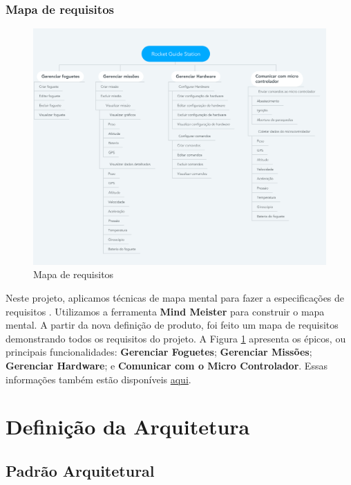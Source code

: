 \subsubsection{Mapa de requisitos}

\begin{figure}[h!]
\centering
\includegraphics[scale=0.18]{figuras/Rocket_Guide_Station.png}  
\caption{Mapa de requisitos}
\label{fig:Mindmeister}
\end{figure}

\par Neste projeto, aplicamos técnicas de mapa mental para fazer a especificações de requisitos \cite{mapamental}. Utilizamos a ferramenta \textbf{Mind Meister} para construir o mapa mental. A partir da nova definição de produto, foi feito um mapa de requisitos demonstrando todos os requisitos do projeto. A Figura \ref{fig:Mindmeister} apresenta os épicos, ou principais funcionalidades: \textbf{Gerenciar Foguetes}; \textbf{Gerenciar Missões}; \textbf{Gerenciar Hardware}; e \textbf{Comunicar com o Micro Controlador}. Essas informações também estão disponíveis \href{https://mm.tt/1664123184?t=VJwmqWSqXf}{aqui}.




\section{Definição da Arquitetura}



\subsection{Padrão Arquitetural}

